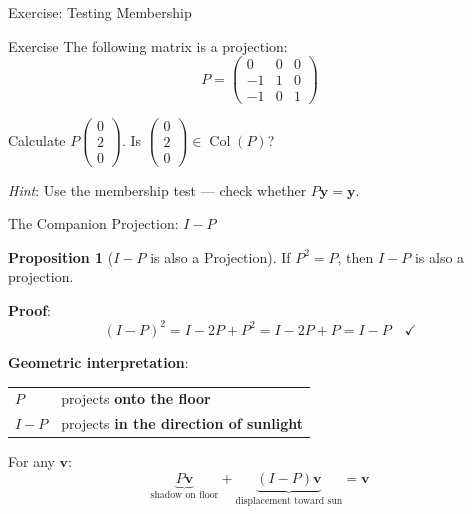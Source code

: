 \documentclass[10pt]{beamer}
\theoremstyle{definition}
\newtheorem{prop}{Proposition}[section]
\newcommand{\x}[1]{\alert{\textbf{#1}}}
\begin{document}
\begin{frame}{Exercise: Testing Membership}

\begin{exampleblock}{Exercise}
The following matrix is a projection:
$$P = \begin{pmatrix} 0 & 0 & 0 \\ -1 & 1 & 0 \\ -1 & 0 & 1 \end{pmatrix}$$

Calculate $P\begin{pmatrix} 0 \\ 2 \\ 0 \end{pmatrix}$. Is $\begin{pmatrix} 0 \\ 2 \\ 0 \end{pmatrix} \in \operatorname{Col}(P)$?
\end{exampleblock}

\vspace{1em}

\textit{Hint}: Use the membership test --- check whether $P\mathbf{y} = \mathbf{y}$.

\end{frame}

\begin{frame}{The Companion Projection: $I - P$}

\begin{prop}[$I - P$ is also a Projection]
If $P^2 = P$, then $I - P$ is also a projection.
\end{prop}

\textbf{Proof}:
$$(I - P)^2 = I - 2P + P^2 = I - 2P + P = I - P \quad\checkmark$$

\vspace{1em}

\x{Geometric interpretation}:

\begin{center}
\begin{tabular}{ll}
$P$ & projects \x{onto the floor} \\
$I - P$ & projects \x{in the direction of sunlight} \\
\end{tabular}
\end{center}

\vspace{0.5em}

For any $\mathbf{v}$:
$$\underbrace{P\mathbf{v}}_{\text{shadow on floor}} + \underbrace{(I-P)\mathbf{v}}_{\text{displacement toward sun}} = \mathbf{v}$$

\end{frame}
\end{document}
